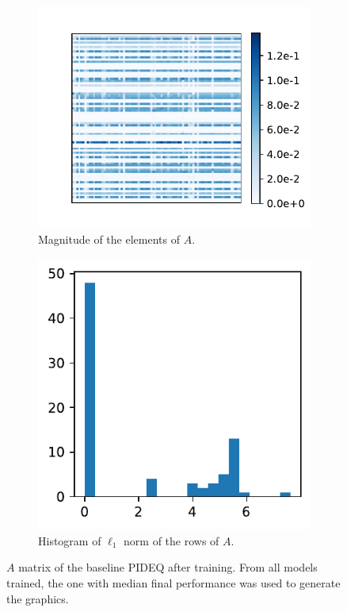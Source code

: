 \begin{figure}[h]
    \centering
    \begin{subfigure}[t]{.5\textwidth}
	\hspace{-1.1cm}\includegraphics{images/exp_1_matplot.pdf}
	\caption{Magnitude of the elements of $A$.}
    \end{subfigure}
    \begin{subfigure}[t]{.45\textwidth}
	\includegraphics{images/exp_1_hist.pdf}
	\caption{Histogram of $\ell_1$ norm of the rows of $A$.}
    \end{subfigure}
    \caption[$A$ matrix of the baseline \gls{PIDEQ} after training.]{$A$ matrix of the baseline \gls{PIDEQ} after training. From all models trained, the one with median final performance was used to generate the graphics.}
    \label{fig:baseline-pideq-A}
\end{figure}

